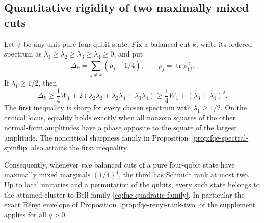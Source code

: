 


\subsection{Quantitative rigidity of two maximally mixed cuts}
\label{sec:fqe-renyi-two-flat}

\begin{proposition}
\label{prop:fqe-two-flat-rigidity}
Let $\psi$ be any unit pure four-qubit state. Fix a balanced cut $k$,
write its ordered spectrum as
$\lambda_1\ge\lambda_2\ge\lambda_3\ge\lambda_4\ge0$,
and put
\[
\Delta_k=\sum_{j\ne k}(p_j-1/4),\qquad
p_j=\operatorname{tr}\rho_{1j}^2.
\]
If $\lambda_1\ge1/2$, then
\[
\boxed{\quad
\Delta_k\ge\frac14W_1+
2(\lambda_2\lambda_3+\lambda_2\lambda_4+
\lambda_3\lambda_4)
\ge\frac14W_1+(\lambda_3+\lambda_4)^2.\quad}
\tag{TF}\label{eq:fqe-two-flat}
\]
The first inequality is sharp for every chosen spectrum with
$\lambda_1\ge1/2$. On the critical locus, equality holds exactly when
all nonzero squares of the other normal-form amplitudes have a phase
opposite to the square of the largest amplitude. The noncritical
sharpness family in Proposition~\ref{prop:fqe-spectral-spinflip} also
attains the first inequality.

Consequently, whenever \emph{two} balanced cuts of a pure
four-qubit state have maximally mixed marginals $(1/4)^4$,
the third has Schmidt rank at most two. Up to local
unitaries and a permutation of the qubits, every such
state belongs to the attained cluster-to-Bell family
\eqref{eq:fqe-quadratic-family}. In particular the exact
R\'enyi envelope of Proposition~\ref{prop:fqe-renyi-rank-two} of the supplement
applies for all $q>0$.
\end{proposition}
